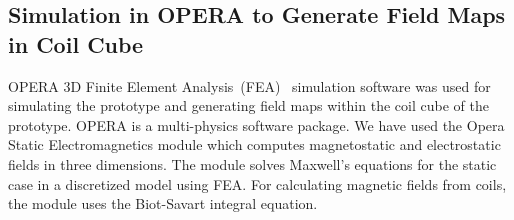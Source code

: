 \subsection{Simulation in OPERA to Generate Field Maps in Coil Cube}

OPERA 3D Finite Element Analysis~(FEA)~\cite{opera} simulation
software was used for simulating the prototype and generating field
maps within the coil cube of the prototype. OPERA is a multi-physics
software package.  We have used the Opera Static Electromagnetics
module which computes magnetostatic and electrostatic fields in three
dimensions. The module solves Maxwell's equations for the static case
in a discretized model using FEA. For calculating magnetic fields from
coils, the module uses the Biot-Savart integral equation.








